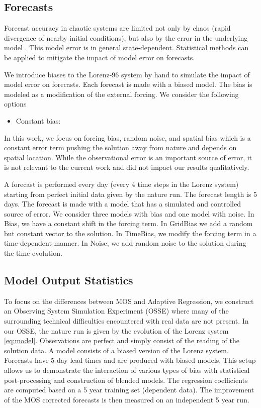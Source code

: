 \documentclass[10pt]{article}
\begin{document}
\subsection{Forecasts}
Forecast accuracy in chaotic systems are limited not only by chaos (rapid divergence of nearby initial conditions), but also by the error in the underlying model \cite{Orrell01}. This model error is in general state-dependent. Statistical methods can be applied to mitigate the impact of model error on forecasts.

We introduce biases to the Lorenz-96 system by hand to simulate the impact of model error on forecasts. Each forecast is made with a biased model. The bias is modeled as a modification of the external forcing. We consider the following options
\begin{itemize}
\item Constant bias: 
\end{itemize}

In this work, we focus on forcing bias, random noise, and spatial bias which is a constant error term pushing the solution away from nature and depends on spatial location. While the observational error is an important source of error, it is not relevant to the current work and did not impact our results qualitatively.

A forecast is performed every day (every 4 time steps in the Lorenz system) starting from perfect initial data given by the nature run. The forecast length is 5 days. The forecast is made with a model that has a simulated and controlled source of error. We consider three models with bias and one model with noise. In Bias, we have a constant shift in the forcing term. In GridBias we add a random but constant vector to the solution. In TimeBias, we modify the forcing term in a time-dependent manner. In Noise, we add random noise to the solution during the time evolution.

\subsection{Model Output Statistics}
To focus on the differences between MOS and Adaptive Regression, we construct an Observing System Simulation Experiment (OSSE) where many of the surrounding technical difficulties encountered with real data are not present. In our OSSE, the nature run is given by the evolution of the Lorenz system \eqref{eq:model}. Observations are perfect and simply consist of the reading of the solution data. A model consists of a biased version of the Lorenz system. Forecasts have 5-day lead times and are produced with biased models. This setup allows us to demonstrate the interaction of various types of bias with statistical post-processing and construction of blended models. The regression coefficients are computed based on a 5 year training set (dependent data). The improvement of the MOS corrected forecasts is then measured on an independent 5 year run.
\end{document}
